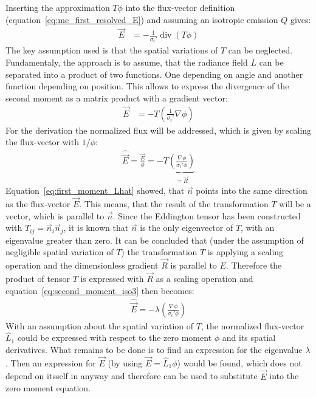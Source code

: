 Inserting the approximation $T\phi$ into the flux-vector definition (equation~\ref{eq:me_first_resolved_E}) and assuming an isotropic emission $Q$ gives:
\begin{align*}
\vec{E}&= -\frac{1}{\sigma_t'}\operatorname{div}\left (T\phi\right )
\end{align*}
The key assumption used is that the spatial variations of $T$ can be neglected. Fundamentaly, the approach is to assume, that the radiance field $L$ can be separated into a product of two functions. One depending on angle and another function depending on position. This allows to express the divergence of the second moment as a matrix product with a gradient vector:
\begin{align}
\vec{E}&= -T\left(\frac{1}{\sigma_t'}\nabla\phi\right )
\label{eq:second_moment_iso2}
\end{align}
For the derivation the normalized flux will be addressed, which is given by scaling the flux-vector with $1/\phi$:
\begin{align}
\widehat{\vec{E}} = \frac{\vec{E}}{\phi}= -T\underbrace{\left(\frac{\nabla\phi}{\sigma_t'\phi}\right )}_{=\vec{R}}
\label{eq:second_moment_iso3}
\end{align}
Equation~\ref{eq:first_moment_Lhat} showed, that $\vec{n}$ points into the same direction as the flux-vector $\vec{E}$. This means, that the result of the transformation $T$ will be a vector, which is parallel to $\vec{n}$. Since the Eddington tensor has been constructed with $T_{ij}=\vec{n}_i\vec{n}_j$, it is known that $\vec{n}$ is the only eigenvector of $T$, with an eigenvalue greater than zero. It can be concluded that (under the assumption of negligible spatial variation of $T$) the transformation $T$ is applying a scaling operation and the dimensionless gradient $\vec{R}$ is parallel to $E$. Therefore the product of tensor $T$ is expressed with $\vec{R}$ as a scaling operation and equation~\ref{eq:second_moment_iso3} then becomes:
\begin{align}
\widehat{\vec{E}} = -\lambda\left(\frac{\nabla\phi}{\sigma_t'\phi}\right )
\label{eq:second_moment_iso4}
\end{align}
With an assumption about the spatial variation of $T$, the normalized flux-vector $\hat{L}_1$ could be expressed with respect to the zero moment $\phi$ and its spatial derivatives. What remains to be done is to find an expression for the eigenvalue $\lambda$. Then an expression for $\vec{E}$ (by using $\vec{E}=\hat{L}_1\phi$) would be found, which does not depend on itsself in anyway and therefore can be used to substitute $\vec{E}$ into the zero moment equation.

